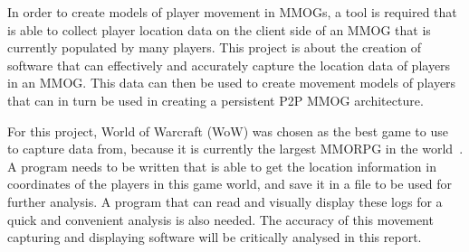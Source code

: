 In order to create models of player movement in MMOGs, a tool is required that is able to collect player location data on the client side of an MMOG that is currently populated by many players. This project is about the creation of software that can effectively and accurately capture the location data of players in an MMOG. This data can then be used to create movement models of players that can in turn be used in creating a persistent P2P MMOG architecture. 



For this project, World of Warcraft (WoW) was chosen as the best game to use to capture data from, because it is currently the largest MMORPG in the world~\cite{subscription}. A program needs to be written that is able to get the location information in coordinates of the players in this game world, and save it in a file to be used for further analysis. A program that can read and visually display these logs for a quick and convenient analysis is also needed. The accuracy of this movement capturing and displaying software will be critically analysed in this report. %

